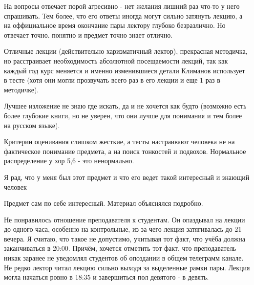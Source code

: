             \begin{commentbox} 
                На вопросы отвечает порой агресивно - нет желания лишний раз что-то у него спрашивать. Тем более, что его ответы иногда могут сильно затянуть лекцию, а на оффициальное время окончание пары лектору глубоко безразлично. Но отвечает точно. понятно и предмет точно знает отлично.

                Отличные лекции (действительно харизматичный лектор), прекрасная методичка, но расстраивает необходимость абсолютной посещаемости лекций, так как каждый год курс меняется и именно изменившиеся детали Климанов использует в тесте (хотя они могли прозвучать всего раз в его лекции и еще 1 раз в методичке). 

                Лучшее изложение не знаю где искать, да и не хочется как будто (возможно есть более глубокие книги, но не уверен, что они лучше для понимания и тем более на русском языке).

                Критерии оценивания слишком жесткие, а тесты настраивают человека не на фактическое понимание предмета, а на поиск тонкостей и подвохов. Нормальное распределение у хор 5,6 - это ненормально.

                Я рад, что у меня был этот предмет и что его ведет такой интересный и знающий человек 
            \end{commentbox} 
        
            \begin{commentbox} 
                Предмет сам по себе интересный. Материал объяснялся подробно.

                Не понравилось отношение преподавателя к студентам. Он опаздывал на лекции до одного часа, особенно на контрольные, из-за чего лекция затягивалась до 21 вечера. Я считаю, что такое не допустимо, учитывая тот факт, что учёба должна заканчиваться в 20:00. Причём, хочется отметить тот факт, что преподаватель никак заранее не уведомлял студентов об опоздании в общем телеграмм канале. Не редко лектор читал лекцию сильно выходя за выделенные рамки пары. Лекция могла начаться ровно в 18:35 и завершиться пол девятого - в девять.  
            \end{commentbox} 
        
